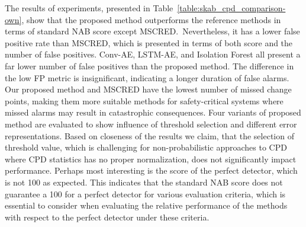 The results of experiments, presented in Table~\ref{table:skab_cpd_comparison-own}, show that the proposed method outperforms the reference methods in terms of standard NAB score except MSCRED.~Nevertheless, it has a lower false positive rate than MSCRED, which is presented in terms of both score and the number of false positives. Conv-AE, LSTM-AE, and Isolation Forest all present a far lower number of false positives than the proposed method. The difference in the low FP metric is insignificant, indicating a longer duration of false alarms. Our proposed method and MSCRED have the lowest number of missed change points, making them more suitable methods for safety-critical systems where missed alarms may result in catastrophic consequences. Four variants of proposed method are evaluated to show influence of threshold selection and different error representations. Based on closeness of the results we claim, that the selection of threshold value, which is challenging for non-probabilistic approaches to CPD where CPD statistics has no proper normalization, does not significantly impact performance. Perhaps most interesting is the score of the perfect detector, which is not 100 as expected. This indicates that the standard NAB score does not guarantee a 100 for a perfect detector for various evaluation criteria, which is essential to consider when evaluating the relative performance of the methods with respect to the perfect detector under these criteria.

